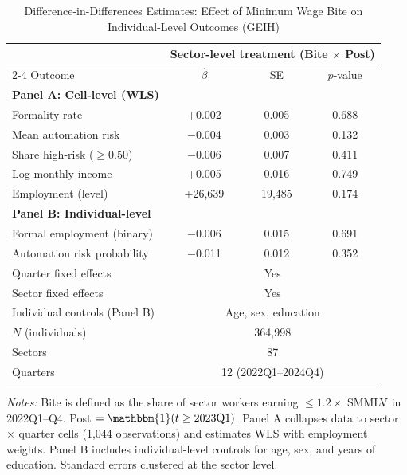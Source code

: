 \documentclass[5p,times,authoryear]{elsarticle}
\begin{document}
\begin{table}[htbp]
\centering
\begin{threeparttable}
\caption{Difference-in-Differences Estimates: Effect of Minimum Wage Bite on Individual-Level Outcomes (GEIH)}
\label{tab:geih_results}
\small
\setlength{\tabcolsep}{5pt}
\begin{tabular}{@{}lccc@{}}
\toprule
& \multicolumn{3}{c}{Sector-level treatment (Bite $\times$ Post)} \\
\cmidrule{2-4}
Outcome & $\hat{\beta}$ & SE & $p$-value \\
\midrule
\textbf{Panel A: Cell-level (WLS)} & & & \\
\quad Formality rate & +0.002 & 0.005 & 0.688 \\
\quad Mean automation risk & $-$0.004 & 0.003 & 0.132 \\
\quad Share high-risk ($\geq 0.50$) & $-$0.006 & 0.007 & 0.411 \\
\quad Log monthly income & +0.005 & 0.016 & 0.749 \\
\quad Employment (level) & +26,639 & 19,485 & 0.174 \\
\textbf{Panel B: Individual-level} & & & \\
\quad Formal employment (binary) & $-$0.006 & 0.015 & 0.691 \\
\quad Automation risk probability & $-$0.011 & 0.012 & 0.352 \\
\midrule
Quarter fixed effects & \multicolumn{3}{c}{Yes} \\
Sector fixed effects & \multicolumn{3}{c}{Yes} \\
Individual controls (Panel B) & \multicolumn{3}{c}{Age, sex, education} \\
$N$ (individuals) & \multicolumn{3}{c}{364,998} \\
Sectors & \multicolumn{3}{c}{87} \\
Quarters & \multicolumn{3}{c}{12 (2022Q1--2024Q4)} \\
\bottomrule
\end{tabular}
\begin{tablenotes}
\footnotesize
\item \textit{Notes:} Bite is defined as the share of sector workers earning $\leq 1.2 \times$ SMMLV in 2022Q1--Q4. Post $= \mathbbm{1}(t \geq 2023\text{Q1})$. Panel A collapses data to sector $\times$ quarter cells (1,044 observations) and estimates WLS with employment weights. Panel B includes individual-level controls for age, sex, and years of education. Standard errors clustered at the sector level.
\end{tablenotes}
\end{threeparttable}
\end{table}
\end{document}
